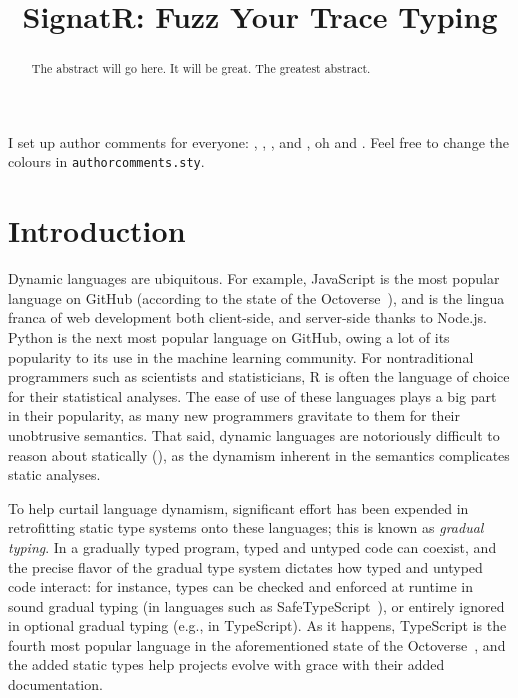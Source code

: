 \documentclass[sigplan,anonymous,review]{acmart}
\newcommand{\Name}{SignatR\xspace}
\begin{document}
\title{\Name: Fuzz Your Trace Typing}

\begin{abstract}
The abstract will go here.
It will be great.
The greatest abstract.

\end{abstract}

\maketitle

I set up author comments for everyone: , , , and , oh and . Feel free to change the
colours in {\tt authorcomments.sty}.

\section{Introduction}
\label{sec:introduction}

Dynamic languages are ubiquitous.
For example, JavaScript is the most popular language on GitHub (according to the state of the Octoverse~\cite{state-of-octoverse-2021}), and is the lingua franca of web development both client-side, and server-side thanks to Node.js.
Python is the next most popular language on GitHub, owing a lot of its popularity to its use in the machine learning community.
For nontraditional programmers such as scientists and statisticians, R is often the language of choice for their statistical analyses.
The ease of use of these languages plays a big part in their popularity, as many new programmers gravitate to them for their unobtrusive semantics.
That said, dynamic languages are notoriously difficult to reason about statically (), as the dynamism inherent in the semantics complicates static analyses.

To help curtail language dynamism, significant effort has been expended in retrofitting static type systems onto these languages; this is known as \textit{gradual typing}.
In a gradually typed program, typed and untyped code can coexist, and the precise flavor of the gradual type system dictates how typed and untyped code interact: for instance, types can be checked and enforced at runtime in sound gradual typing (in languages such as SafeTypeScript~\cite{rastogi2015safe}), or entirely ignored in optional gradual typing (e.g., in TypeScript).
As it happens, TypeScript is the fourth most popular language in the aforementioned state of the Octoverse~\cite{state-of-octoverse-2021}, and the added static types help projects evolve with grace with their added documentation.
\end{document}
